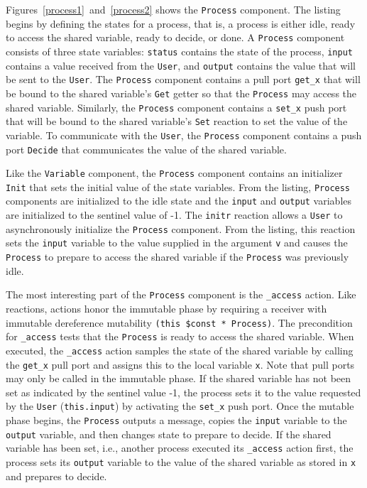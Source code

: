 Figures~\ref{process1}~and~\ref{process2} shows the \verb+Process+ component.
The listing begins by defining the states for a process, that is, a process is either idle, ready to access the shared variable, ready to decide, or done.
A \verb+Process+ component consists of three state variables:  \verb+status+ contains the state of the process, \verb+input+ contains a value received from the \verb+User+, and \verb+output+ contains the value that will be sent to the \verb+User+.
The \verb+Process+ component contains a pull port \verb+get_x+ that will be bound to the shared variable's \verb+Get+ getter so that the \verb+Process+ may access the shared variable.
Similarly, the \verb+Process+ component contains a \verb+set_x+ push port that will be bound to the shared variable's \verb+Set+ reaction to set the value of the variable.
To communicate with the \verb+User+, the \verb+Process+ component contains a push port \verb+Decide+ that communicates the value of the shared variable.

Like the \verb+Variable+ component, the \verb+Process+ component contains an initializer \verb+Init+ that sets the initial value of the state variables.
From the listing, \verb+Process+ components are initialized to the idle state and the \verb+input+ and \verb+output+ variables are initialized to the sentinel value of -1.
The \verb+initr+ reaction allows a \verb+User+ to asynchronously initialize the \verb+Process+ component.
From the listing, this reaction sets the \verb+input+ variable to the value supplied in the argument \verb+v+ and causes the \verb+Process+ to prepare to access the shared variable if the \verb+Process+ was previously idle.

The most interesting part of the \verb+Process+ component is the \verb+_access+ action.
Like reactions, actions honor the immutable phase by requiring a receiver with immutable dereference mutability \verb+(this $const * Process)+.
The precondition for \verb+_access+ tests that the \verb+Process+ is ready to access the shared variable.
When executed, the \verb+_access+ action samples the state of the shared variable by calling the \verb+get_x+ pull port and assigns this to the local variable \verb+x+.
Note that pull ports may only be called in the immutable phase.
If the shared variable has not been set as indicated by the sentinel value -1, the process sets it to the value requested by the \verb+User+ (\verb+this.input+) by activating the \verb+set_x+ push port.
Once the mutable phase begins, the \verb+Process+ outputs a message, copies the \verb+input+ variable to the \verb+output+ variable, and then changes state to prepare to decide.
If the shared variable has been set, i.e., another process executed its \verb+_access+ action first, the process sets its \verb+output+ variable to the value of the shared variable as stored in \verb+x+ and prepares to decide.

